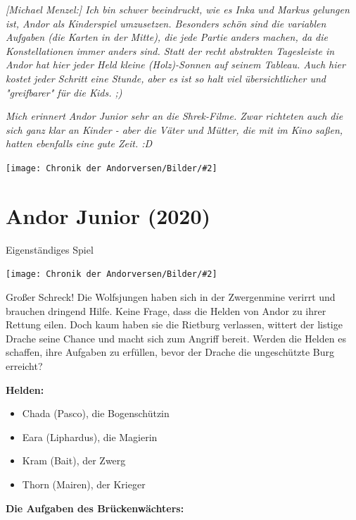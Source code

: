 \documentclass[10pt, a4paper, oneside]{book}
\newcommand{\fillbreak}{\vspace*{\fill}\columnbreak}
\newcommand{\produkt}[1]{%
    \section{#1}%
    \label{Produkt: #1}%
}
\newcommand{\bildmitts}[2][height=0.32\textwidth,width=0.48\textwidth,keepaspectratio]{%
    \begin{center}
        \texttt{[image: Chronik der Andorversen/Bilder/\#2]}
    \end{center}
}
\begin{document}
\begin{multicols}{2}
\begin{chapterbox}
    \textit{[Michael Menzel:] Ich bin schwer beeindruckt, wie es Inka und Markus gelungen ist, Andor als Kinderspiel umzusetzen. Besonders schön sind die variablen Aufgaben (die Karten in der Mitte), die jede Partie anders machen, da die Konstellationen immer anders sind. Statt der recht abstrakten Tagesleiste in Andor hat hier jeder Held kleine (Holz)-Sonnen auf seinem Tableau. Auch hier kostet jeder Schritt eine Stunde, aber es ist so halt viel übersichtlicher und "greifbarer" für die Kids. ;)}
    
    \textit{Mich erinnert Andor Junior sehr an die Shrek-Filme. Zwar richteten auch die sich ganz klar an Kinder - aber die Väter und Mütter, die mit im Kino saßen, hatten ebenfalls eine gute Zeit. :D}
    
    
    \bildmitts[width=\textwidth]{Andor Junior Feiern.jpeg}

\end{chapterbox}



\fillbreak
\produkt{Andor Junior (2020)}

\begin{center}
    Eigenständiges Spiel
\end{center}


\bildmitts{Andor Junior (2020).png}

Großer Schreck! Die Wolfsjungen haben sich in der Zwergenmine verirrt und brauchen dringend Hilfe. Keine Frage, dass die Helden von Andor zu ihrer Rettung eilen. Doch kaum haben sie die Rietburg verlassen, wittert der listige Drache seine Chance und macht sich zum Angriff bereit. Werden die Helden es schaffen, ihre Aufgaben zu erfüllen, bevor der Drache die ungeschützte Burg erreicht?\bigskip

\textbf{Helden:}

\begin{itemize}[topsep=0pt,itemsep=-1ex,partopsep=1ex,parsep=1ex]
    \item Chada (Pasco), die Bogenschützin 
    \item Eara (Liphardus), die Magierin 
    \item Kram (Bait), der Zwerg 
    \item Thorn (Mairen), der Krieger 
\end{itemize}


\textbf{Die Aufgaben des Brückenwächters:}


\end{multicols}
\end{document}

